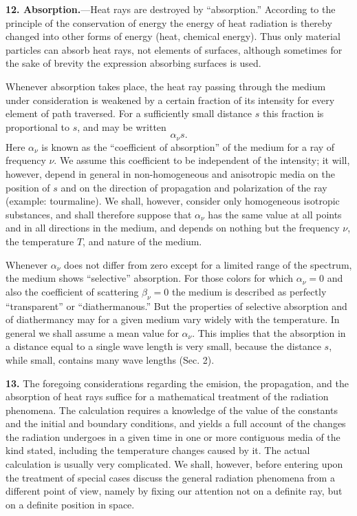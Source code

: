 \documentclass[12pt,oneside]{book}
\begin{document}
\textbf{12. Absorption.}---Heat rays are destroyed by ``absorption.'' According to the principle of the conservation of energy the energy of heat radiation is thereby changed into other forms of energy (heat, chemical energy). Thus only material particles can absorb heat rays, not elements of surfaces, although sometimes for the sake of brevity the expression absorbing surfaces is used. \par

Whenever absorption takes place, the heat ray passing through the medium under consideration is weakened by a certain fraction of its intensity for every element of path traversed. For a sufficiently small distance $s$ this fraction is proportional to $s$, and may be written
\begin{equation}
    \alpha_\nu s.
    \label{eq4}
\end{equation}
Here $\alpha_\nu$ is known as the ``coefficient of absorption'' of the medium for a ray of frequency $\nu$. We assume this coefficient to be independent of the intensity; it will, however, depend in general in non-homogeneous and anisotropic media on the position of $s$ and on the direction of propagation and polarization of the ray (example: tourmaline). We shall, however, consider only homogeneous isotropic substances, and shall therefore suppose that $\alpha_\nu$ has the same value at all points and in all directions in the medium, and depends on nothing but the frequency $\nu$, the temperature $T$, and nature of the medium. \par

Whenever $\alpha_\nu$ does not differ from zero except for a limited range of the spectrum, the medium shows ``selective'' absorption. For those colors for which $\alpha_\nu=0$ and also the coefficient of scattering $\beta_\nu=0$ the medium is described as perfectly ``transparent'' or ``diathermanous.'' But the properties of selective absorption and of diathermancy may for a given medium vary widely with the temperature. In general we shall assume a mean value for $\alpha_\nu$. This implies that the absorption in a distance equal to a single wave length is very small, because the distance $s$, while small, contains many wave lengths (Sec. 2). \par

\textbf{13.} The foregoing considerations regarding the emision, the propagation, and the absorption of heat rays suffice for a mathematical treatment of the radiation phenomena. The calculation requires a knowledge of the value of the constants and the initial and boundary conditions, and yields a full account of the changes the radiation undergoes in a given time in one or more contiguous media of the kind stated, including the temperature changes caused by it. The actual calculation is usually very complicated. We shall, however, before entering upon the treatment of special cases discuss the general radiation phenomena from a different point of view, namely by fixing our attention not on a definite ray, but on a definite position in space. \par
\end{document}
